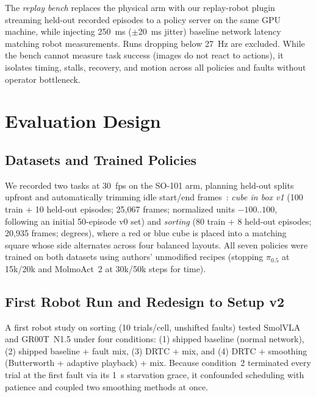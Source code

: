 \documentclass[conference]{IEEEtran}
\newcommand{\drtc}{DRTC}
\newcommand{\smolvla}{SmolVLA}
\newcommand{\groot}{GR00T~N1.5}
\newcommand{\pizerofive}{$\pi_{0.5}$}
\begin{document}
The \emph{replay bench} replaces the physical arm with our replay-robot plugin streaming held-out recorded episodes to a policy server on the same GPU machine, while injecting 250~ms ($\pm$20~ms jitter) baseline network latency matching robot measurements. Runs dropping below 27~Hz are excluded. While the bench cannot measure task success (images do not react to actions), it isolates timing, stalls, recovery, and motion across all policies and faults without operator bottleneck.

\section{Evaluation Design}

\subsection{Datasets and Trained Policies}

We recorded two tasks at 30~fps on the SO-101 arm, planning held-out splits upfront and automatically trimming idle start/end frames~\cite{valloss2026}: \emph{cube in box v1} (100 train + 10 held-out episodes; 25{,}067 frames; normalized units $-100$..$100$, following an initial 50-episode v0 set) and \emph{sorting} (80 train + 8 held-out episodes; 20{,}935 frames; degrees), where a red or blue cube is placed into a matching square whose side alternates across four balanced layouts. All seven policies were trained on both datasets using authors' unmodified recipes (stopping \pizerofive{} at 15k/20k and MolmoAct~2 at 30k/50k steps for time).

\subsection{First Robot Run and Redesign to Setup v2}

A first robot study on sorting (10 trials/cell, unshifted faults) tested \smolvla{} and \groot{} under four conditions: (1) shipped baseline (normal network), (2) shipped baseline + fault mix, (3) \drtc{} + mix, and (4) \drtc{} + smoothing (Butterworth + adaptive playback) + mix. Because condition~2 terminated every trial at the first fault via its 1~s starvation grace, it confounded scheduling with patience and coupled two smoothing methods at once.
\end{document}
